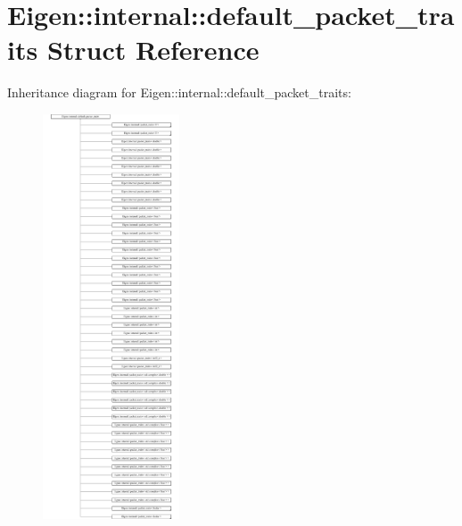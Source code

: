 \hypertarget{struct_eigen_1_1internal_1_1default__packet__traits}{}\section{Eigen\+:\+:internal\+:\+:default\+\_\+packet\+\_\+traits Struct Reference}
\label{struct_eigen_1_1internal_1_1default__packet__traits}
Inheritance diagram for Eigen\+:\+:internal\+:\+:default\+\_\+packet\+\_\+traits\+:\begin{figure}[H]
\begin{center}
\leavevmode
\includegraphics[height=12.000000cm]{struct_eigen_1_1internal_1_1default__packet__traits}
\end{center}
\end{figure}
